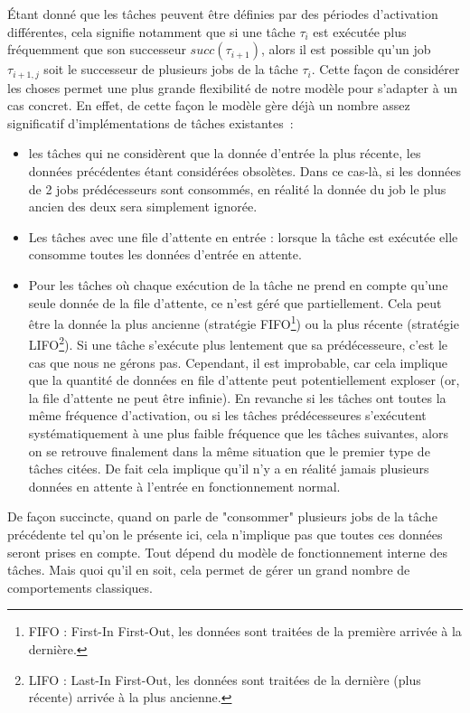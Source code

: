 \documentclass[french, a4paper, 11pt, twoside, pdftex]{StyleThese}
\begin{document}
  		Étant donné que les tâches peuvent être définies par des périodes d'activation différentes, cela signifie notamment que si une tâche $\tau_i$ est exécutée plus fréquemment que son successeur $succ(\tau_{i+1})$, alors il est possible  qu'un job $\tau_{i+1,j}$ soit le successeur de plusieurs jobs de la tâche $\tau_{i}$. Cette façon de considérer les choses permet une plus grande flexibilité de notre modèle pour s'adapter à un cas concret. En effet, de cette façon le modèle gère déjà un nombre assez significatif d'implémentations de tâches existantes~:
	\begin{itemize}
		\item   		les tâches qui ne considèrent que la donnée d'entrée la plus récente, les données précédentes étant considérées obsolètes. Dans ce cas-là, si les données de 2 jobs prédécesseurs sont consommés, en réalité la donnée du job le plus ancien des deux sera simplement ignorée.
		\item   		Les tâches avec une file d'attente en entrée : lorsque la tâche est exécutée elle consomme toutes les données d'entrée en attente.
		\item   		Pour les tâches où chaque exécution de la tâche ne prend en compte qu'une seule donnée de la file d'attente, ce n'est géré que partiellement. Cela peut être la donnée la plus ancienne (stratégie FIFO\footnote{FIFO : First-In First-Out, les données sont traitées de la première arrivée à la dernière.}) ou la plus récente (stratégie LIFO\footnote{LIFO : Last-In First-Out, les données sont traitées de la dernière (plus récente) arrivée à la plus ancienne.}). Si une tâche s'exécute plus lentement que sa prédécesseure, c'est le cas que nous ne gérons pas. Cependant, il est improbable, car cela implique que la quantité de données en file d'attente peut potentiellement exploser (or, la file d'attente ne peut être infinie). En revanche si les tâches ont toutes la même fréquence d'activation, ou si les tâches prédécesseures s'exécutent systématiquement à une plus faible fréquence que les tâches suivantes, alors on se retrouve finalement dans la même situation que le premier type de tâches citées. De fait cela implique qu'il n'y a en réalité jamais plusieurs données en attente à l'entrée en fonctionnement normal. 
	\end{itemize}
  		De façon succincte, quand on parle de "consommer" plusieurs jobs de la tâche précédente tel qu'on le présente ici, cela n'implique pas que toutes ces données seront prises en compte. Tout dépend du modèle de fonctionnement interne des tâches. Mais quoi qu'il en soit, cela permet de gérer un grand nombre de comportements classiques.
  		
\end{document}
